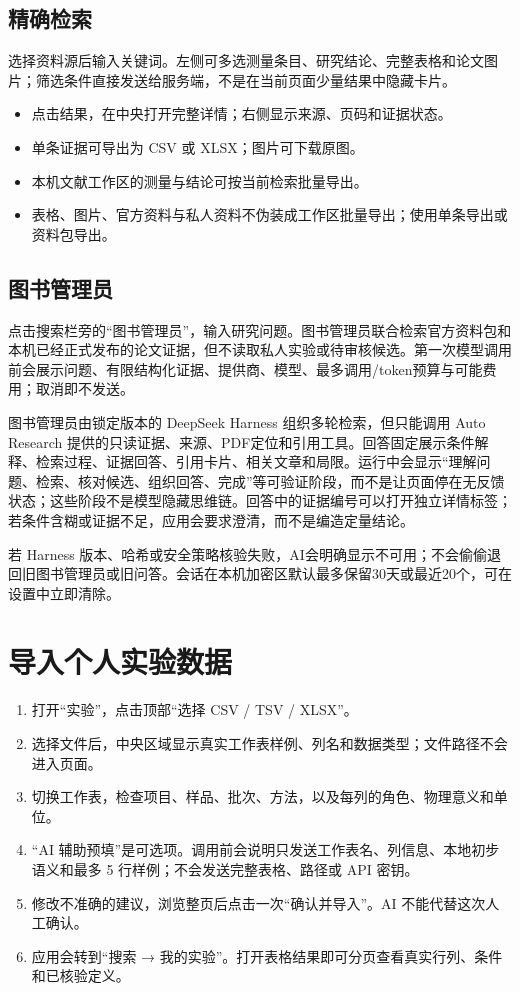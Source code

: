 \documentclass[11pt,a4paper]{ctexart}
\begin{document}
\subsection{精确检索}

选择资料源后输入关键词。左侧可多选测量条目、研究结论、完整表格和论文图片；筛选条件直接发送给服务端，不是在当前页面少量结果中隐藏卡片。

\begin{itemize}
  \item 点击结果，在中央打开完整详情；右侧显示来源、页码和证据状态。
  \item 单条证据可导出为 CSV 或 XLSX；图片可下载原图。
  \item 本机文献工作区的测量与结论可按当前检索批量导出。
  \item 表格、图片、官方资料与私人资料不伪装成工作区批量导出；使用单条导出或资料包导出。
\end{itemize}

\subsection{图书管理员}

点击搜索栏旁的“图书管理员”，输入研究问题。图书管理员联合检索官方资料包和本机已经正式发布的论文证据，但不读取私人实验或待审核候选。第一次模型调用前会展示问题、有限结构化证据、提供商、模型、最多调用/token预算与可能费用；取消即不发送。

图书管理员由锁定版本的 DeepSeek Harness 组织多轮检索，但只能调用 Auto Research 提供的只读证据、来源、PDF定位和引用工具。回答固定展示条件解释、检索过程、证据回答、引用卡片、相关文章和局限。运行中会显示“理解问题、检索、核对候选、组织回答、完成”等可验证阶段，而不是让页面停在无反馈状态；这些阶段不是模型隐藏思维链。回答中的证据编号可以打开独立详情标签；若条件含糊或证据不足，应用会要求澄清，而不是编造定量结论。

若 Harness 版本、哈希或安全策略核验失败，AI会明确显示不可用；不会偷偷退回旧图书管理员或旧问答。会话在本机加密区默认最多保留30天或最近20个，可在设置中立即清除。

\section{导入个人实验数据}

\begin{enumerate}
  \item 打开“实验”，点击顶部“选择 CSV / TSV / XLSX”。
  \item 选择文件后，中央区域显示真实工作表样例、列名和数据类型；文件路径不会进入页面。
  \item 切换工作表，检查项目、样品、批次、方法，以及每列的角色、物理意义和单位。
  \item “AI 辅助预填”是可选项。调用前会说明只发送工作表名、列信息、本地初步语义和最多 5 行样例；不会发送完整表格、路径或 API 密钥。
  \item 修改不准确的建议，浏览整页后点击一次“确认并导入”。AI 不能代替这次人工确认。
  \item 应用会转到“搜索 → 我的实验”。打开表格结果即可分页查看真实行列、条件和已核验定义。
\end{enumerate}
\end{document}

